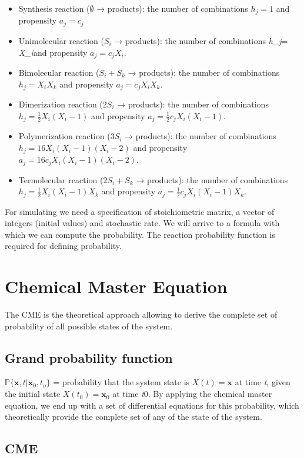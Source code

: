 \begin{itemize}
  \item Synthesis reaction ($\emptyset$ → products): the number of combinations $ h_j = 1 $ and propensity $ a_j =c_j $
  \item Unimolecular reaction ($ S_i$ → products): the number of combinations \emph{h\_j}= \emph{X\_i}and propensity $ a_j = c_jX_i $.
  \item Bimolecular reaction ($ S_i + S_k$ → products): the number of combinations $ h_j = X_iX_k$ and propensity $ a_j = c_jX_iX_k $.
  \item Dimerization reaction ($2S_i$ → products): the number of combinations $ h_j = \frac{1}{2}X_i(X_i -1) $ and propensity $ a_j = \frac{1}{2}c_jX_i(X_i -1) $.
  \item Polymerization reaction ($3S_i$ → products): the number of combinations $ h_j = 16X_i(X_i -1)(X_i -2)$ and propensity $ a_j = 16c_jX_i(X_i -1)(X_i -2) $.
  \item Termolecular reaction ($2S_i + S_k$ → products): the number of combinations $ h_j = \frac{1}{2}X_i(X_i -1)X_k$ and propensity $ a_j = \frac{1}{2}c_jX_i(X_i -1)X_k $.
\end{itemize}

For simulating we need a specification of stoichiometric matrix, a vector of integers (initial values) and stochastic rate.
We will arrive to a formula with which we can compute the probability.
The reaction probability function is required for defining probability.

\section{Chemical Master Equation}
The CME is the theoretical approach allowing to derive the complete set of probability of all possible states of the system.

  \subsection{Grand probability function}
  $\mathbb{P}\{\mathbf{x},t|\mathbf{x}_0,t_o\}$ = probability that the system state is $X(t) = \mathbf{x}$ at time \emph{t}, given the initial state $X(t_0) = \mathbf{x}_0$ at time \emph{t}0.
  By applying the chemical master equation, we end up with a set of differential equations for this probability, which theoretically provide the complete set of any of the state of the system.

  \subsection{CME}

